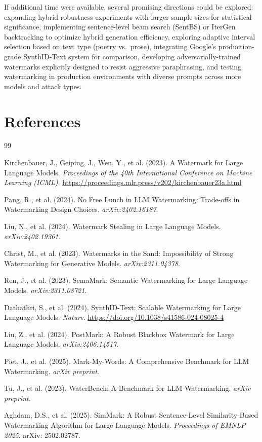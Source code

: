 \documentclass[12pt,letterpaper]{article}
\begin{document}
If additional time were available, several promising directions could be explored: expanding hybrid robustness experiments with larger sample sizes for statistical significance, implementing sentence-level beam search (SentBS) or IterGen backtracking to optimize hybrid generation efficiency, exploring adaptive interval selection based on text type (poetry vs.\ prose), integrating Google's production-grade SynthID-Text system for comparison, developing adversarially-trained watermarks explicitly designed to resist aggressive paraphrasing, and testing watermarking in production environments with diverse prompts across more models and attack types.

\section{References}

\begin{thebibliography}{99}

Kirchenbauer, J., Geiping, J., Wen, Y., et al. (2023). A Watermark for Large Language Models. \textit{Proceedings of the 40th International Conference on Machine Learning (ICML)}. \url{https://proceedings.mlr.press/v202/kirchenbauer23a.html}

Pang, R., et al. (2024). No Free Lunch in LLM Watermarking: Trade-offs in Watermarking Design Choices. \textit{arXiv:2402.16187}.

Liu, N., et al. (2024). Watermark Stealing in Large Language Models. \textit{arXiv:2402.19361}.

Christ, M., et al. (2023). Watermarks in the Sand: Impossibility of Strong Watermarking for Generative Models. \textit{arXiv:2311.04378}.

Ren, J., et al. (2023). SemaMark: Semantic Watermarking for Large Language Models. \textit{arXiv:2311.08721}.

Dathathri, S., et al. (2024). SynthID-Text: Scalable Watermarking for Large Language Models. \textit{Nature}. \url{https://doi.org/10.1038/s41586-024-08025-4}

Liu, Z., et al. (2024). PostMark: A Robust Blackbox Watermark for Large Language Models. \textit{arXiv:2406.14517}.

Piet, J., et al. (2025). Mark-My-Words: A Comprehensive Benchmark for LLM Watermarking. \textit{arXiv preprint}.

Tu, J., et al. (2023). WaterBench: A Benchmark for LLM Watermarking. \textit{arXiv preprint}.

Aghdam, D.S., et al. (2025). SimMark: A Robust Sentence-Level Similarity-Based Watermarking Algorithm for Large Language Models. \textit{Proceedings of EMNLP 2025}. arXiv: 2502.02787.

\end{thebibliography}
\end{document}
